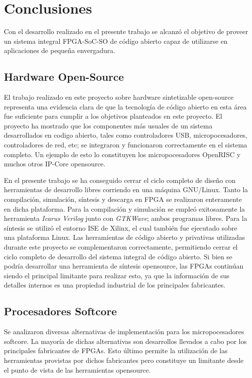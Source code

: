 
\chapter{Conclusiones}
 

Con el desarrollo realizado en el presente trabajo se alcanzó el objetivo de proveer un sistema integral FPGA-SoC-SO de código abierto
capaz de utilizarse en aplicaciones de pequeña envergadura.

\section{Hardware Open-Source}

El trabajo realizado en este proyecto sobre hardware sintetizable open-source representa una evidencia clara de que la tecnología de
código abierto en esta área fue suficiente para cumplir a los objetivos planteados en este proyecto. El proyecto ha mostrado que los componentes
más usuales de un sistema desarrollados en codigo abierto, tales como controladores USB, micropocesadores, controladores de red, etc; se integraron
y funcionaron correctamente en el sistema completo. Un ejemplo de esto lo constituyen los micropocesadores OpenRISC y muchos otros IP-Core
opensource.

En el presente trabajo se ha conseguido cerrar el ciclo completo de diseño con herramientas de desarrollo libres corriendo en una máquina GNU/Linux.
Tanto la compilación, simulación, síntesis y descarga en FPGA se realizaron enteramente en dicha plataforma. Para la compilación y
simulación se empleó exitosamente la herramienta \textit{Icarus Verilog} junto con \textit{GTKWave}; ambos programas libres. Para la síntesis se
utilizó el entorno ISE de Xilinx, el cual también fue ejecutado sobre una plataforma Linux. Las herramientas de código abierto y privativas
utilizadas durante este proyecto se complementaron correctamente, permitiendo cerrar el ciclo completo de desarrollo del sistema integral de código
abierto. Si bien se podría desarrollar una herramienta de síntesis opensource, las FPGAs continúan siendo el principal limitante para realizar esto, ya
que la información de sus detalles internos es una propiedad industrial de los principales fabricantes. 

\section{Procesadores Softcore}

Se analizaron diversas alternativas de implementación para los micropocesadores softcore. La mayoría de dichas alternativas son desarrollos llevados
a cabo por los principales fabricantes de FPGAs. Esto último permite la utilización de las herramientas provistas por dichos fabricantes pero
constituye un limitante desde el punto de vista de las herramientas opensource.

